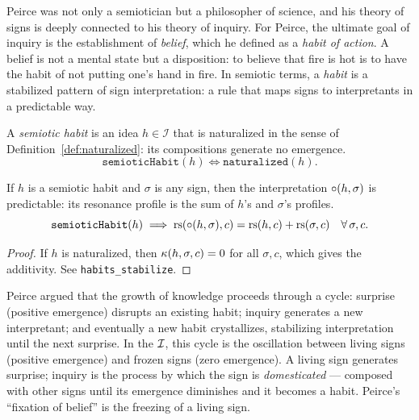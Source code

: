 Peirce was not only a semiotician but a philosopher of science, and
his theory of signs is deeply connected to his theory of inquiry.
For Peirce, the ultimate goal of inquiry is the establishment of
\emph{belief}, which he defined as a \emph{habit of action}. A
belief is not a mental state but a disposition: to believe that fire
is hot is to have the habit of not putting one's hand in fire. In
semiotic terms, a \emph{habit} is a stabilized pattern of sign
interpretation: a rule that maps signs to interpretants in a
predictable way.

\begin{definition}
\label{def:semiotic-habit}
A \emph{semiotic habit} is an idea $h \in \mathcal{I}$ that is
naturalized in the sense of Definition~\ref{def:naturalized}: its
compositions generate no emergence.
\[
  \texttt{semioticHabit}(h) \iff \texttt{naturalized}(h).
\]
\end{definition}

\begin{theorem}
\label{thm:habits-stabilize}
If $h$ is a semiotic habit and $\sigma$ is any sign, then the
interpretation $\circ(h, \sigma)$ is predictable: its resonance
profile is the sum of $h$'s and $\sigma$'s profiles.
\[
  \texttt{semioticHabit}(h) \implies
  \mathrm{rs}(\circ(h, \sigma), c) = \mathrm{rs}(h, c) + \mathrm{rs}(\sigma, c)
  \quad \forall\, \sigma, c.
\]
\end{theorem}

\begin{proof}
If $h$ is naturalized, then $\kappa(h, \sigma, c) = 0$ for all
$\sigma, c$, which gives the additivity. See
\texttt{habits\_stabilize}.
\end{proof}

\begin{interpretation}
Peirce argued that the growth of knowledge proceeds through a cycle:
surprise (positive emergence) disrupts an existing habit; inquiry
generates a new interpretant; and eventually a new habit crystallizes,
stabilizing interpretation until the next surprise. In the $\mathcal{I}$,
this cycle is the oscillation between living signs (positive
emergence) and frozen signs (zero emergence). A living sign
generates surprise; inquiry is the process by which the sign is
\emph{domesticated} --- composed with other signs until its emergence
diminishes and it becomes a habit. Peirce's ``fixation of belief''
is the freezing of a living sign.
\end{interpretation}

